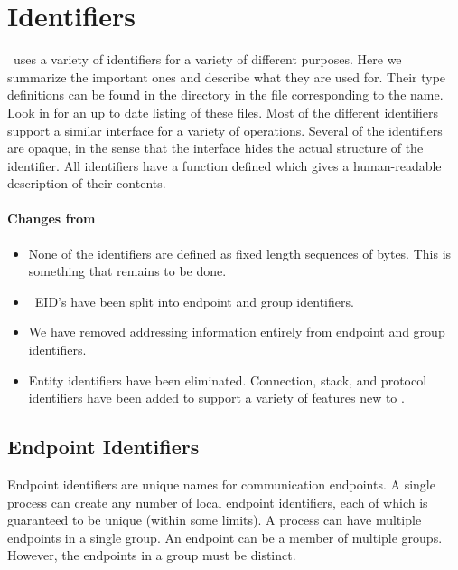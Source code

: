 %
%
%
\section{Identifiers}

\ensemble\ uses a variety of identifiers for a variety of different
purposes.  Here we summarize the important ones and describe what they
are used for.  Their type definitions can be found in the
 directory in the file corresponding to the name.
Look in  for an up to date listing of these files.
Most of the different identifiers support a similar interface for a
variety of operations.  Several of the identifiers are opaque, in the
sense that the interface hides the actual structure of the identifier.
All identifiers have a  function defined which
gives a human-readable description of their contents.

\paragraph{Changes from \horus}
\begin{itemize}
\item
None of the identifiers are defined as fixed length sequences of
bytes.  This is something that remains to be done.
\item
\horus\ EID's have been split into endpoint and group identifiers.
\item
We have removed addressing information entirely from endpoint and
group identifiers.
\item
Entity identifiers have been eliminated.  Connection, stack, and
protocol identifiers have been added to support a variety of features
new to \ensemble.
\end{itemize}

\subsection{Endpoint Identifiers}
Endpoint identifiers are unique names for communication endpoints.  A
single process can create any number of local endpoint identifiers,
each of which is guaranteed to be unique (within some limits).  A
process can have multiple endpoints in a single group.  An endpoint
can be a member of multiple groups.  However, the endpoints in a group
must be distinct.

